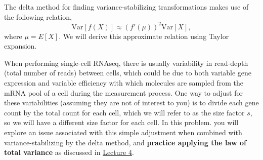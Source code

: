 \documentclass[11pt]{exam}
\begin{document}
  \begin{questions}
  \question[20] The delta method for finding variance-stabilizing transformations makes use of the following relation,
\[\mathrm{Var}[f(X)] \approx (f'(\mu))^2 \mathrm{Var}[X], \]
where $\mu = E[X]$. We will derive this approximate relation using Taylor expansion. 

\newpage
\question[40] When performing single-cell RNAseq, there is usually variability in read-depth (total number of reads) between cells, which could be due to both variable gene expression and variable efficiency with which molecules are sampled from the mRNA pool of a cell during the measurement process. One way to adjust for these variabilities (assuming they are not of interest to you) is to divide each gene count by the total count for each cell, which we will refer to as the size factor $s$, so we will have a different size factor for each cell. In this problem. you will explore an issue associated with this simple adjustment when combined with variance-stabilizing by the delta method, and \textbf{practice applying the law of total variance} as discussed in \href{https://docs.google.com/presentation/d/1ZJQQSgKdQA7PUw2HyZmgJwRN1IgRXA0e1XTmL9D3iF8/edit#slide=id.g10d12d755e5_0_229}{Lecture 4}.

\end{questions}
\end{document}
